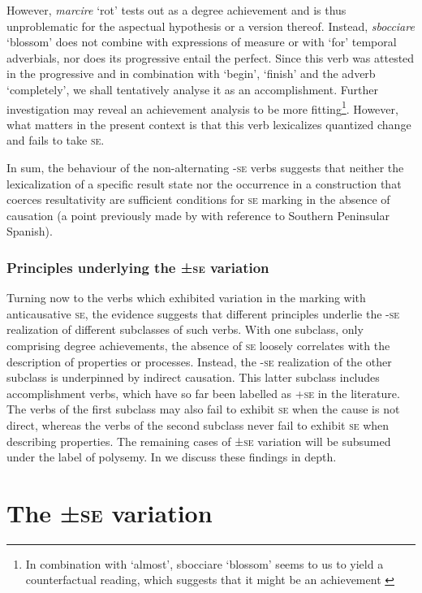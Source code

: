 \documentclass[output=paper,colorlinks,citecolor=brown
]{langscibook}
\begin{document}
However, \textit{marcire} ‘rot’ tests out as a degree achievement and is thus unproblematic for the aspectual hypothesis or a version thereof. Instead, \textit{sbocciare} ‘blossom’ does not combine with expressions of measure or with ‘for’ temporal adverbials, nor does its progressive entail the perfect. Since this verb was attested in the progressive and in combination with ‘begin’, ‘finish’ and the adverb ‘completely’, we shall tentatively analyse it as an accomplishment. Further investigation may reveal an achievement analysis to be more fitting\footnote{In combination with ‘almost’, sbocciare ‘blossom’ seems to us to yield a counterfactual reading, which suggests that it might be an achievement \citep{hay1999scalar}}.  However, what matters in the present context is that this verb lexicalizes quantized change and fails to take \textsc{se}. 

In sum, the behaviour of the non-alternating -\textsc{se} verbs suggests that neither the lexicalization of a specific result state nor the occurrence in a construction that coerces resultativity are sufficient conditions for \textsc{se} marking in the absence of causation (a point previously made by \citet{jimenez2017causativity} with reference to Southern Peninsular Spanish).  

\subsubsection{Principles underlying the ±\textsc{se} variation}
\label{bentley_section_3.3.3}
Turning now to the verbs which exhibited variation in the marking with anticausative \textsc{se}, the evidence suggests that different principles underlie the -\textsc{se} realization of different subclasses of such verbs. With one subclass, only comprising degree achievements, the absence of \textsc{se} loosely correlates with the description of properties or processes. Instead, the -\textsc{se} realization of the other subclass is underpinned by indirect causation. This latter subclass includes accomplishment verbs, which have so far been labelled as +\textsc{se} in the literature. The verbs of the first subclass may also fail to exhibit \textsc{se} when the cause is not direct, whereas the verbs of the second subclass never fail to exhibit \textsc{se} when describing properties. The remaining cases of ±\textsc{se} variation will be subsumed under the label of polysemy. In  we discuss these findings in depth.

\section{The ±\textsc{se} variation}
\label{bentley_section_4}
\end{document}
